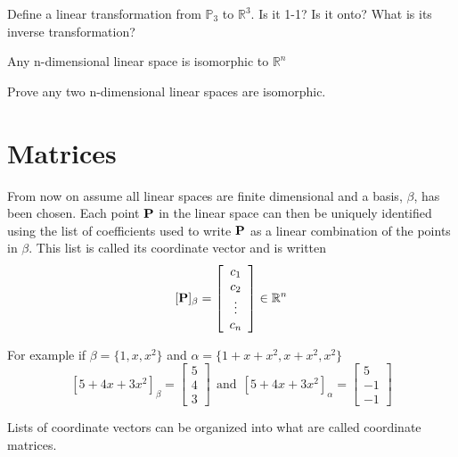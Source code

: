 \begin{myexc}[\bd{c}]
	Define a linear transformation from $\mathbb{P}_3$ to $\mathbb{R}^3$. Is it 1-1? Is it onto? What is its inverse transformation? 
\end{myexc}


\begin{theorem}
	Any n-dimensional linear space is isomorphic to $\mathbb{R}^{n}$
\end{theorem}

\noindent {}   Prove any two n-dimensional linear spaces are isomorphic.

\vspace{.5cm}

\section{Matrices}    \label{Matrices}

From now on assume all linear spaces are finite dimensional and a basis, $\beta$, has been chosen. Each point $\textbf{P}$ in the linear space can then be uniquely identified using the list of coefficients used to write $\textbf{P}$ as a linear combination of the points in $\beta$.  This list is called its coordinate vector and is written  \[  [\textbf{P}]_{\beta} = \left[  \begin{array}{c} c_1\\c_2\\ \vdots \\c_n \end{array} \right]\in\mathbb{R}^n \] 



\noindent For example if $\beta=\{1,x,x^2\}$ and $\alpha = \{1+x+x^2,x+x^2,x^2\}$
 \[ [5+4x+3x^2]_{\beta}= \left[  \begin{array}{c} 5\\4\\3\end{array} \right]  \ \ \text{and} \ \ [5+4x+3x^2]_{\alpha}= \left[  \begin{array}{r} 5\\-1\\-1\end{array} \right] \] 

Lists of coordinate vectors can be organized into what are called coordinate matrices. 



